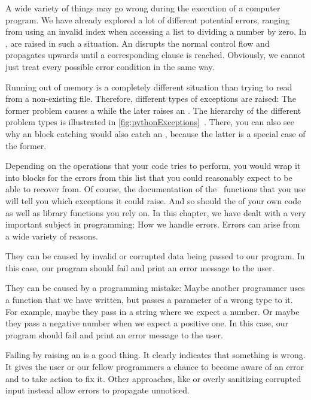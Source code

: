 %
A wide variety of things may go wrong during the execution of a computer program.
We have already explored a lot of different potential errors, ranging from using an invalid index when accessing a list to dividing a number by zero.
In \python,  are raised in such a situation.
An  disrupts the normal control flow and propagates upwards until a corresponding  clause is reached.
Obviously, we cannot just treat every possible error condition in the same way.

Running out of memory is a completely different situation than trying to read from a non-existing file.
Therefore, different types of exceptions are raised:
The former problem causes a  while the later raises an .
The hierarchy of the different problem types is illustrated in \cref{fig:pythonExceptions}~\cite{PSF2024BIE}.
There, you can also see why an  block catching  would also catch an , because the latter is a special case of the former.

Depending on the operations that your code tries to perform, you would wrap it into  blocks for the errors from this list that you could reasonably expect to be able to recover from.
Of course, the documentation of the \python\ functions that you use will tell you which exceptions it could raise.
And so should the  of your own code as well as library functions you rely on.%
\endhsection%
%
%
In this chapter, we have dealt with a very important subject in programming:
How we handle errors.
Errors can arise from a wide variety of reasons.

They can be caused by invalid or corrupted data being passed to our program.
In this case, our program should fail and print an error message to the user.

They can be caused by a programming mistake:
Maybe another programmer uses a function that we have written, but passes a parameter of a wrong type to it.
For example, maybe they pass in a string where we expect a number.
Or maybe they pass a negative number when we expect a positive one.
In this case, our program should fail and print an error message to the user.

Failing by raising an  is a good thing.
It clearly indicates that something is wrong.
It gives the user or our fellow programmers a chance to become aware of an error and to take action to fix it.
Other approaches, like  or overly sanitizing corrupted input instead allow errors to propagate unnoticed.

